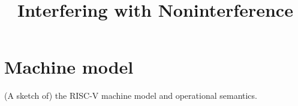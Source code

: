 \documentclass[conference]{IEEEtran}
\newif\ifdraft \drafttrue
\newif\iftext \textfalse
\newcommand{\bcp}[1]{\ifdraft\textcolor{violet}{{[BCP:~#1]}}\fi}
\begin{document}
\title{Interfering with Noninterference
\iftext\thanks{\bcp{Identify applicable funding agencies here (DARPA and NSF
    and...?)}}\fi
}

\iftext
\author{\IEEEauthorblockN{Roberto Blanco}
\IEEEauthorblockA{\textit{\bcp{affiliation?}}
}
\and
\IEEEauthorblockN{Leonidas Lampropoulos}
\IEEEauthorblockA{\textit{University of Maryland \bcp{right?}}
  }
\and
\IEEEauthorblockN{Benjamin C. Pierce}
\IEEEauthorblockA{\textit{University of Pennsylvania}
  }
\and
\IEEEauthorblockN{Andrew Tolmach}
\IEEEauthorblockA{\textit{Portland State University}
}
}
\fi

\maketitle

\iftext
\begin{abstract}
\end{abstract}

\begin{IEEEkeywords}
\end{IEEEkeywords}
\fi

\section{Machine model}

(A sketch of) the RISC-V machine model and operational semantics.
\end{document}
